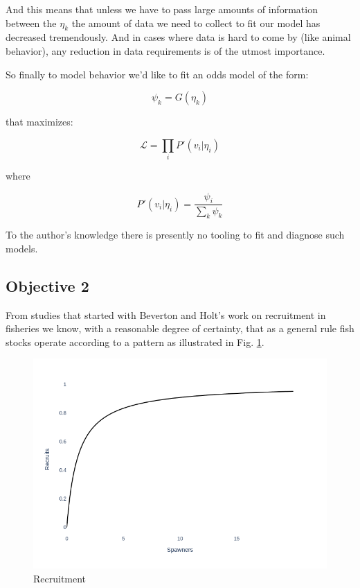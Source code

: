 \documentclass[11pt]{article}
\begin{document}
And this means that unless we have to pass large amounts of information between the $\eta_k$ the amount of data we need to collect to fit our model has decreased tremendously. And in cases where data is hard to come by (like animal behavior), any reduction in data requirements is of the utmost importance. 

So finally to model behavior we'd like to fit an odds model of the form:

$$\psi_k = G(\eta_k)$$

that maximizes:

$$\mathcal{L}=\prod_i P'(v_i | \eta_i)$$

where 

$$P'(v_i|\eta_i) = \frac{\psi_i}{\sum_k \psi_k}$$\newline

To the author's knowledge there is presently no tooling to fit and diagnose such models. 







\subsection{Objective 2}

From studies that started with Beverton and Holt's work on recruitment in fisheries we know, with a reasonable degree of certainty, that as a general rule fish stocks operate according to a pattern as illustrated in Fig. \ref{fig:recruitment}.

\begin{figure}[h!] 
  \includegraphics[width=\linewidth]{recruitment.png}
  \caption{Recruitment}
  \label{fig:recruitment}
\end{figure}
\end{document}
